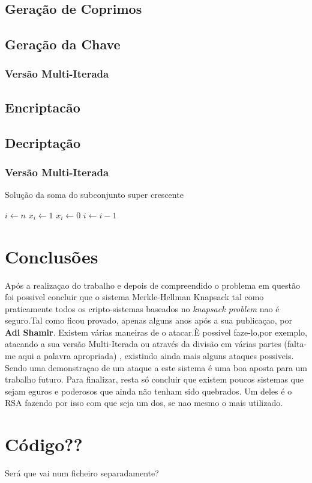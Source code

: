 \documentclass[11pt]{report}
\begin{document}
\section{Geração de Coprimos}

\section{Geração da Chave}

\subsection{Versão Multi-Iterada}

\section{Encriptacão}

\section{Decriptação}

\subsection{Versão Multi-Iterada}

\begin{algorithm}
	\caption{Solução da soma do subconjunto super crescente}
	\begin{algorithmic}[1]
		\State $i \gets n$
				\State $x_i \gets 1$
			\Else
				\State $x_i \gets 0 $
			\EndIf
		\State $i \gets i - 1$
		\EndWhile
\end{algorithmic}
\end{algorithm}


\chapter{Conclusões}

Após a realizaçao do trabalho e depois de compreendido o problema em questão foi possivel concluir que o sistema Merkle-Hellman Knapsack tal como praticamente todos os cripto-sistemas baseados no \textit{knapsack problem} nao é seguro.Tal como ficou provado, apenas alguns anos após a sua publicaçao, por \textbf{Adi Shamir}. 
Existem várias maneiras de o atacar.È possivel faze-lo,por exemplo, atacando a sua versão Multi-Iterada ou através da divisão em várias partes (falta-me aqui a palavra apropriada) , existindo ainda mais alguns ataques possiveis. Sendo uma demonstraçao de um ataque a este sistema é uma boa aposta para um trabalho futuro.
Para finalizar, resta só concluir que existem poucos sistemas que sejam eguros e poderosos que ainda não tenham sido quebrados. Um deles é o RSA fazendo por isso com que seja um dos, se nao mesmo o mais utilizado. 



\appendix

\chapter{Código??}

Será que vai num ficheiro separadamente?
\end{document}
